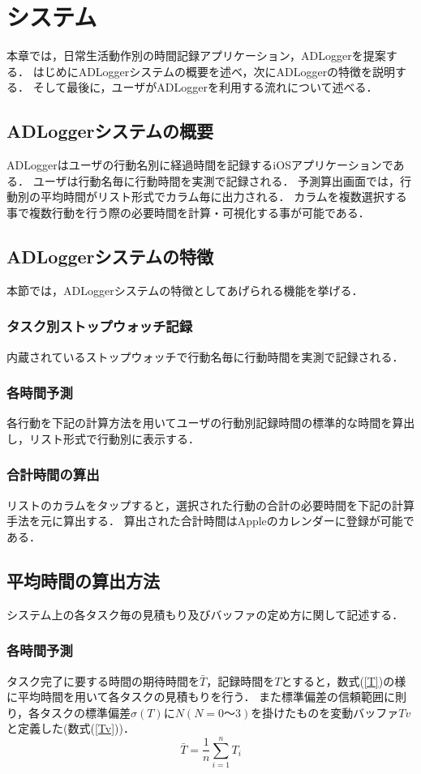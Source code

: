\chapter{システム}
本章では，日常生活動作別の時間記録アプリケーション，ADLoggerを提案する．
はじめにADLoggerシステムの概要を述べ，次にADLoggerの特徴を説明する．
そして最後に，ユーザがADLoggerを利用する流れについて述べる．

\section{ADLoggerシステムの概要}
ADLoggerはユーザの行動名別に経過時間を記録するiOSアプリケーションである．
ユーザは行動名毎に行動時間を実測で記録される．
予測算出画面では，行動別の平均時間がリスト形式でカラム毎に出力される．
カラムを複数選択する事で複数行動を行う際の必要時間を計算・可視化する事が可能である．

\section{ADLoggerシステムの特徴}
本節では，ADLoggerシステムの特徴としてあげられる機能を挙げる．

\subsection{タスク別ストップウォッチ記録}
内蔵されているストップウォッチで行動名毎に行動時間を実測で記録される．

\subsection{各時間予測}
各行動を下記の計算方法を用いてユーザの行動別記録時間の標準的な時間を算出し，リスト形式で行動別に表示する．

\subsection{合計時間の算出}
リストのカラムをタップすると，選択された行動の合計の必要時間を下記の計算手法を元に算出する．
算出された合計時間はAppleのカレンダーに登録が可能である．


\section{平均時間の算出方法}
システム上の各タスク毎の見積もり及びバッファの定め方に関して記述する．
\subsection{各時間予測}
タスク完了に要する時間の期待時間を$\bar{T}$，記録時間を$T$とすると，数式(\ref{T})の様に平均時間を用いて各タスクの見積もりを行う．
また標準偏差の信頼範囲に則り，各タスクの標準偏差$\sigma (T)$に$N (N=0〜3)$を掛けたものを変動バッファ$Tv$と定義した(数式(\ref{Tv}))．
\begin{equation}
\label{T}
\bar{T}=\frac{1}{n}\displaystyle\sum_{i=1}^{n}T_{i}
\end{equation}

